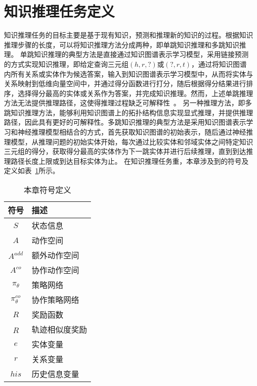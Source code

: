 \documentclass[algorithmlist, AutoFakeBold, AutoFakeSlant, figurelist, tablelist, nomlist, masters]{seuthesix}
\begin{document}
\section{知识推理任务定义}
知识推理任务的目标主要是基于现有知识，预测和推理新的知识的过程。根据知识推理步骤的长度，可以将知识推理方法分成两种，即单跳知识推理和多跳知识推理。
单跳知识推理的典型方法是直接通过知识图谱表示学习模型，采用链接预测的方式实现知识推理，即给定查询三元组$\left(h, r, ?\right)$或$\left(?, r, t\right)$，通过将知识图谱内所有关系或实体作为候选答案，输入到知识图谱表示学习模型中，从而将实体与关系映射到低维向量空间中，并通过得分函数进行打分，随后根据得分结果进行排序，选择得分最高的实体或关系作为答案，并完成知识推理。然而，上述单跳推理方法无法提供推理路径，这使得推理过程缺乏可解释性~\cite{wang2019deeppath}。
另一种推理方法，即多跳知识推理方法，能够利用知识图谱上的拓扑结构信息实现显式推理，并提供推理路径，因此具有更好的可解释性。多跳知识推理的典型方法是采用知识图谱表示学习和神经推理模型相结合的方式，首先获取知识图谱的初始表示，随后通过神经推理模型，从推理问题的初始实体开始，每次通过比较实体和邻域实体之间特定知识三元组的得分，获取得分最高的实体作为下一跳实体并进行后续推理，直到到达推理路径长度上限或到达目标实体为止。
在知识推理任务重，本章涉及到的符号及定义如表~\ref{3_symbols}所示。
\begin{table}
  \centering
  \begin{tabular*}{0.4\textwidth}{@{\extracolsep{\fill}}cl}
		\toprule[1pt]
    符号 & 描述 \\ \hline
    $S$ & 状态信息\\
    $A$ & 动作空间\\
    $A^{add}$ & 额外动作空间\\
    $A^{co}$ & 协作动作空间\\
    $\pi_\theta$ & 策略网络\\
    $\pi_\theta^{co}$ & 协作策略网络\\
    $R$ & 奖励函数\\
    $\hat{R}$ & 轨迹相似度奖励\\
    $e$ & 实体变量\\
    $r$ & 关系变量\\
    $his$ & 历史信息变量\\
		\bottomrule[1pt]
	\end{tabular*}
  \caption{本章符号定义}
  \label{3_symbols}
\end{table}
\end{document}
